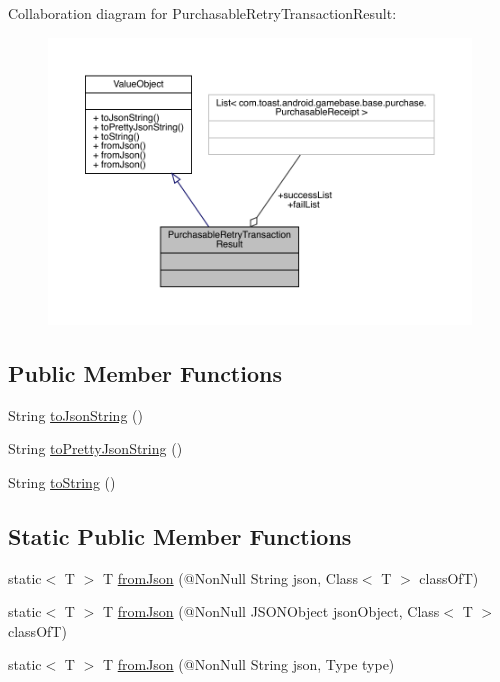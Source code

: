 Collaboration diagram for Purchasable\+Retry\+Transaction\+Result\+:
\nopagebreak
\begin{figure}[H]
\begin{center}
\leavevmode
\includegraphics[width=350pt]{classcom_1_1toast_1_1android_1_1gamebase_1_1base_1_1purchase_1_1_purchasable_retry_transaction_result__coll__graph}
\end{center}
\end{figure}
\subsection*{Public Member Functions}
\begin{DoxyCompactItemize}
\item 
String \hyperlink{classcom_1_1toast_1_1android_1_1gamebase_1_1base_1_1_value_object_a58acf6402880e9769d79d8667581fa6a}{to\+Json\+String} ()
\item 
String \hyperlink{classcom_1_1toast_1_1android_1_1gamebase_1_1base_1_1_value_object_a054431f3d988a22295cfc8b784ff2637}{to\+Pretty\+Json\+String} ()
\item 
String \hyperlink{classcom_1_1toast_1_1android_1_1gamebase_1_1base_1_1_value_object_ad146fa8579a5f8a876c4688cc5a68520}{to\+String} ()
\end{DoxyCompactItemize}
\subsection*{Static Public Member Functions}
\begin{DoxyCompactItemize}
\item 
static$<$ T $>$ T \hyperlink{classcom_1_1toast_1_1android_1_1gamebase_1_1base_1_1_value_object_ae6655c88c20a9a8406dc11b46250ac7b}{from\+Json} (@Non\+Null String json, Class$<$ T $>$ class\+OfT)
\item 
static$<$ T $>$ T \hyperlink{classcom_1_1toast_1_1android_1_1gamebase_1_1base_1_1_value_object_ab83c4196ee2e3f11553bbe0f04dc2101}{from\+Json} (@Non\+Null J\+S\+O\+N\+Object json\+Object, Class$<$ T $>$ class\+OfT)
\item 
static$<$ T $>$ T \hyperlink{classcom_1_1toast_1_1android_1_1gamebase_1_1base_1_1_value_object_aa901d97d495150b54bcb80c05672f58a}{from\+Json} (@Non\+Null String json, Type type)
\end{DoxyCompactItemize}
